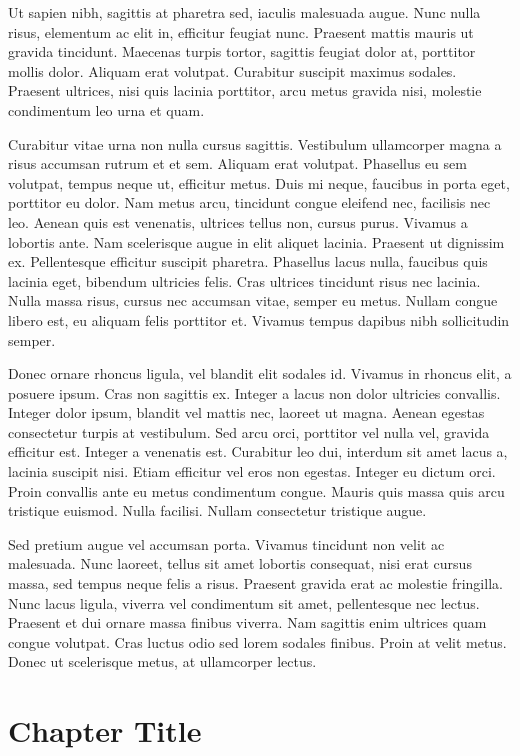 \documentclass[a4paper]{memoir}
\begin{document}
Ut sapien nibh, sagittis at pharetra sed, iaculis malesuada augue. Nunc nulla risus, elementum ac elit in, efficitur feugiat nunc. Praesent mattis mauris ut gravida tincidunt. Maecenas turpis tortor, sagittis feugiat dolor at, porttitor mollis dolor. Aliquam erat volutpat. Curabitur suscipit maximus sodales. Praesent ultrices, nisi quis lacinia porttitor, arcu metus gravida nisi, molestie condimentum leo urna et quam. 

Curabitur vitae urna non nulla cursus sagittis. Vestibulum ullamcorper magna a risus accumsan rutrum et et sem. Aliquam erat volutpat. Phasellus eu sem volutpat, tempus neque ut, efficitur metus. Duis mi neque, faucibus in porta eget, porttitor eu dolor. Nam metus arcu, tincidunt congue eleifend nec, facilisis nec leo. Aenean quis est venenatis, ultrices tellus non, cursus purus. Vivamus a lobortis ante. Nam scelerisque augue in elit aliquet lacinia. Praesent ut dignissim ex. Pellentesque efficitur suscipit pharetra. Phasellus lacus nulla, faucibus quis lacinia eget, bibendum ultricies felis. Cras ultrices tincidunt risus nec lacinia. Nulla massa risus, cursus nec accumsan vitae, semper eu metus. Nullam congue libero est, eu aliquam felis porttitor et. Vivamus tempus dapibus nibh sollicitudin semper. 

Donec ornare rhoncus ligula, vel blandit elit sodales id. Vivamus in rhoncus elit, a posuere ipsum. Cras non sagittis ex. Integer a lacus non dolor ultricies convallis. Integer dolor ipsum, blandit vel mattis nec, laoreet ut magna. Aenean egestas consectetur turpis at vestibulum. Sed arcu orci, porttitor vel nulla vel, gravida efficitur est. Integer a venenatis est. Curabitur leo dui, interdum sit amet lacus a, lacinia suscipit nisi. Etiam efficitur vel eros non egestas. Integer eu dictum orci. Proin convallis ante eu metus condimentum congue. Mauris quis massa quis arcu tristique euismod. Nulla facilisi. Nullam consectetur tristique augue. 

Sed pretium augue vel accumsan porta. Vivamus tincidunt non velit ac malesuada. Nunc laoreet, tellus sit amet lobortis consequat, nisi erat cursus massa, sed tempus neque felis a risus. Praesent gravida erat ac molestie fringilla. Nunc lacus ligula, viverra vel condimentum sit amet, pellentesque nec lectus. Praesent et dui ornare massa finibus viverra. Nam sagittis enim ultrices quam congue volutpat. Cras luctus odio sed lorem sodales finibus. Proin at velit metus. Donec ut scelerisque metus, at ullamcorper lectus. 

\chapter{Chapter Title}
\label{chaptertitle}
\end{document}

